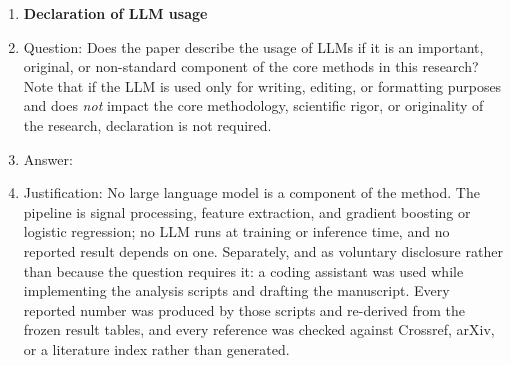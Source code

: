 \begin{enumerate}
\item {\bf Declaration of LLM usage}
    \item[] Question: Does the paper describe the usage of LLMs if it is an important, original, or non-standard component of the core methods in this research? Note that if the LLM is used only for writing, editing, or formatting purposes and does \emph{not} impact the core methodology, scientific rigor, or originality of the research, declaration is not required.
    \item[] Answer: \answerNA{}
    \item[] Justification: No large language model is a component of the method. The pipeline is signal processing, feature extraction, and gradient boosting or logistic regression; no LLM runs at training or inference time, and no reported result depends on one. Separately, and as voluntary disclosure rather than because the question requires it: a coding assistant was used while implementing the analysis scripts and drafting the manuscript. Every reported number was produced by those scripts and re-derived from the frozen result tables, and every reference was checked against Crossref, arXiv, or a literature index rather than generated.

\end{enumerate}
